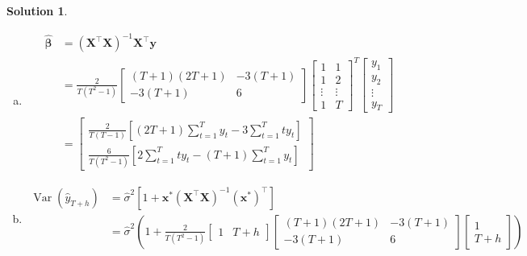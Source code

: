 \documentclass[a4paper,UTF8]{article}
\numberwithin{equation}{section}
\newtheorem*{mySol}{Solution}
\begin{document}
\begin{enumerate}
\begin{mySol}
\begin{enumerate}[a.]
\begin{align*}
             &= \frac{1}{3T(T^2+1)}\begin{bmatrix}3T(T^2+1)&0\\0&3T(T^2+1)\end{bmatrix} \\
             &= I
         \end{align*}
         So, $\left(\boldsymbol{X}^\top \boldsymbol{X}\right)^{-1}=\frac{2}{T\left(T^2-1\right)}\left[\begin{array}{cc}(T+1)(2 T+1) & -3(T+1) \\ -3(T+1) & 6\end{array}\right]$
         \item \begin{align*}
             \hat{\boldsymbol{\beta}}&=\left(\boldsymbol{X}^\top \boldsymbol{X}\right)^{-1} \boldsymbol{X}^\top \boldsymbol{y} \\
             &=\frac{2}{T\left(T^2-1\right)}\left[\begin{array}{cc}(T+1)(2 T+1) & -3(T+1) \\ -3(T+1) & 6\end{array}\right]
             \begin{bmatrix}1&1\\1&2\\\vdots&\vdots\\1&T\end{bmatrix}^T\begin{bmatrix}y_1\\y_2\\\vdots\\y_T\end{bmatrix} \\
             &=\begin{bmatrix}\frac{2}{T(T-1)}\left[(2 T+1) \sum_{t=1}^T y_t-3 \sum_{t=1}^T t y_t\right] \\ \frac{6}{T\left(T^2-1\right)}\left[2 \sum_{t=1}^T t y_t-(T+1) \sum_{t=1}^T y_t\right]\end{bmatrix}
         \end{align*}
         \item \begin{align*}
            \operatorname{Var}\left(\hat{y}_{T+h}\right)
            &= \hat\sigma^2\left[1+\boldsymbol{x}^*\left(\boldsymbol{X}^\top \boldsymbol{X}\right)^{-1}\left(\boldsymbol{x}^*\right)^\top\right] \\
            &= \hat\sigma^2\left(1+\frac{2}{T\left(T^2-1\right)}\begin{bmatrix}1&T+h\end{bmatrix}\left[\begin{array}{cc}(T+1)(2 T+1) & -3(T+1) \\ -3(T+1) & 6\end{array}\right]\begin{bmatrix}1\\T+h\end{bmatrix}\right)\\

\end{align*}
\end{enumerate}
\end{mySol}
\end{enumerate}
\end{document}
